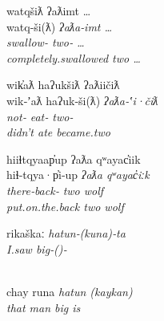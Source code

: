 \begin{exe}
\begin{xlist}
  \end{xlist}

  \ex\label{ex:1.4}
  \begin{xlist}

    \gllll watqšiƛ              ʔaƛimt            …\\
           watq‑ši(ƛ)           \em{ʔaƛa}‑imt      …\\
           swallow‑     \em{two}‑ …\\
           completely.swallowed two               …\\

    \gllll wik̓aƛ        haʔukšiƛ     ʔaƛiičiƛ\\
           wik‑ʼaƛ      haʔuk‑ši(ƛ)  \em{ʔaƛa}‑ʽi·čiƛ\\
           not‑ eat‑ \em{two}‑\\
           didn’t       ate          became.two\\

    \gllll hiiɬtqyaap̓up             ʔaƛa      qʷayac̓iik\\
           hiɬ‑tqya·p̓i‑up           \em{ʔaƛa} qʷayac̓iːk\\
           there‑back‑ \em{two}  wolf\\
           put.on.the.back          two       wolf\\

  \end{xlist}

  \ex\label{ex:1.5}
  \begin{xlist}

    \glll rikaškaː \em{hatun}‑(kuna)‑ta\\
          I.saw    \em{big}‑()‑\\
          \\

    \glll chay runa \em{hatun} (kaykan)\\
          that man  \em{big}   is\\
          \\


\end{xlist}
\end{exe}
